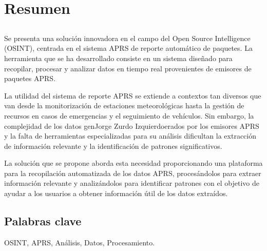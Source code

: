 \chapter*{Resumen}

\section*{\tituloPortadaVal}

Se presenta una solución innovadora en el campo del Open Source Intelligence (OSINT), centrada en el sistema APRS de reporte automático de paquetes. La herramienta que se ha desarrollado consiste en un sistema diseñado para recopilar, procesar y analizar datos en tiempo real provenientes de emisores de paquetes APRS.

	La utilidad del sistema de reporte APRS se extiende a contextos tan diversos que van desde la monitorización de estaciones meteorológicas hasta la gestión de recursos en casos de emergencias y el seguimiento de vehículos. Sin embargo, la complejidad de los datos genJorge Zurdo Izquierdoerados por los emisores APRS y la falta de herramientas especializadas para su análisis dificultan la extracción de información relevante y la identificación de patrones significativos.

	La solución que se propone aborda esta necesidad proporcionando una plataforma para la recopilación automatizada de los datos APRS, procesándolos para extraer información relevante y analizándolos para identificar patrones con el objetivo de ayudar a los usuarios a obtener información útil de los datos extraídos.


\section*{Palabras clave}
   
\noindent OSINT, APRS, Análisis, Datos, Procesamiento.

   


